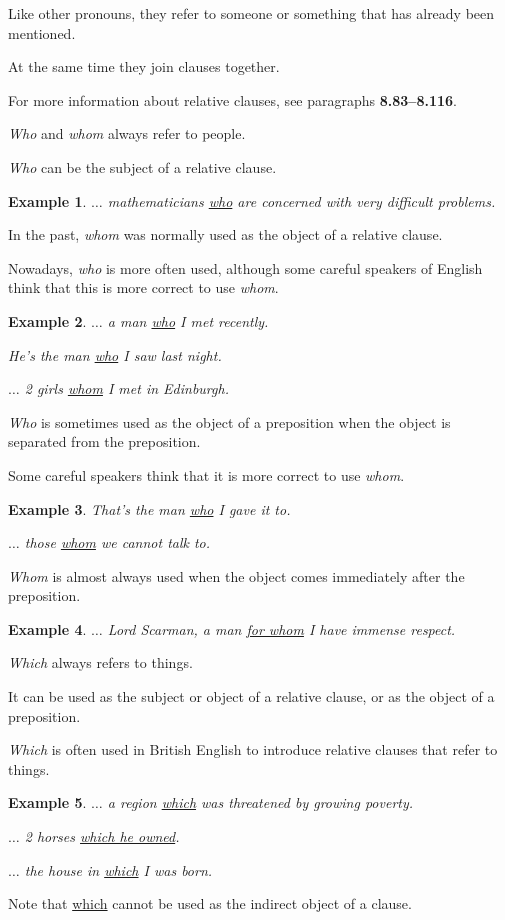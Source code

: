 \documentclass[oneside]{book}
\numberwithin{equation}{section}
\newtheorem{example}{Example}[section]
\begin{document}
Like other pronouns, they refer to someone or something that has already been mentioned.

At the same time they join clauses together.

%
For more information about relative clauses, see paragraphs \textbf{8.83--8.116}.

%
\noindent{} \textit{Who} and \textit{whom} always refer to people.

%
\textit{Who} can be the subject of a relative clause.
\begin{example}
    $\ldots$ mathematicians \underline{who} are concerned with very difficult problems.
\end{example}
In the past, \textit{whom} was normally used as the object of a relative clause.

Nowadays, \textit{who} is more often used, although some careful speakers of English think that this is more correct to use \textit{whom}.
\begin{example}
    $\ldots$ a man \underline{who} I met recently.
    
    He's the man \underline{who} I saw last night.
    
    $\ldots$ 2 girls \underline{whom} I met in Edinburgh.
\end{example}
\textit{Who} is sometimes used as the object of a preposition when the object is separated from the preposition.

Some careful speakers think that it is more correct to use \textit{whom}.
\begin{example}
    That's the man \underline{who} I gave it to.
    
    $\ldots$ those \underline{whom} we cannot talk to.
\end{example}
\textit{Whom} is almost always used when the object comes immediately after the preposition.
\begin{example}
    $\ldots$ Lord Scarman, a man \underline{for whom} I have immense respect.
\end{example}
%
\noindent{} \textit{Which} always refers to things.

It can be used as the subject or object of a relative clause, or as the object of a preposition.

\textit{Which} is often used in British English to introduce relative clauses that refer to things.
\begin{example}
    $\ldots$ a region \underline{which} was threatened by growing poverty.
    
    $\ldots$ 2 horses \underline{which he owned}.
    
    $\ldots$ the house in \underline{which} I was born.
\end{example}
Note that \underline{which} cannot be used as the indirect object of a clause.
\end{document}
